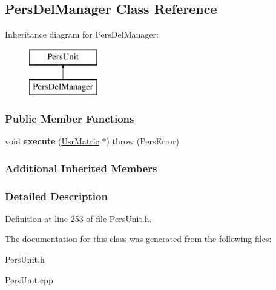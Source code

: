 \hypertarget{classPersDelManager}{\subsection{Pers\-Del\-Manager Class Reference}
\label{d6/d2b/classPersDelManager}
}
Inheritance diagram for Pers\-Del\-Manager\-:\begin{figure}[H]
\begin{center}
\leavevmode
\includegraphics[height=2.000000cm]{d6/d2b/classPersDelManager}
\end{center}
\end{figure}
\subsubsection*{Public Member Functions}
\begin{DoxyCompactItemize}
\item 
\hypertarget{classPersDelManager_acd2f4ba61e71dee6f71fe8c5e37535a7}{void {\bfseries execute} (\hyperlink{classUsrMatric}{Usr\-Matric} $\ast$)  throw (\-Pers\-Error)}\label{d6/d2b/classPersDelManager_acd2f4ba61e71dee6f71fe8c5e37535a7}

\end{DoxyCompactItemize}
\subsubsection*{Additional Inherited Members}


\subsubsection{Detailed Description}


Definition at line 253 of file Pers\-Unit.\-h.



The documentation for this class was generated from the following files\-:\begin{DoxyCompactItemize}
\item 
Pers\-Unit.\-h\item 
Pers\-Unit.\-cpp\end{DoxyCompactItemize}
